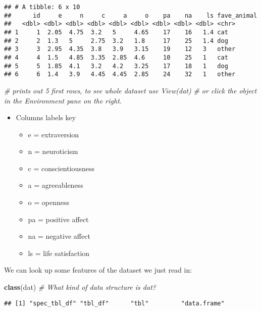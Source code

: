 \documentclass[
]{article}
\newenvironment{Shaded}{\begin{snugshade}}{\end{snugshade}}
\newcommand{\CommentTok}[1]{\textcolor[rgb]{0.56,0.35,0.01}{\textit{#1}}}
\newcommand{\FunctionTok}[1]{\textcolor[rgb]{0.13,0.29,0.53}{\textbf{#1}}}
\newcommand{\NormalTok}[1]{#1}
\providecommand{\tightlist}{%
  \setlength{\itemsep}{0pt}\setlength{\parskip}{0pt}}
\begin{document}
\begin{verbatim}
## # A tibble: 6 x 10
##      id     e     n     c     a     o    pa    na    ls fave_animal
##   <dbl> <dbl> <dbl> <dbl> <dbl> <dbl> <dbl> <dbl> <dbl> <chr>      
## 1     1  2.05  4.75  3.2   5     4.65    17    16   1.4 cat        
## 2     2  1.3   5     2.75  3.2   1.8     17    25   1.4 dog        
## 3     3  2.95  4.35  3.8   3.9   3.15    19    12   3   other      
## 4     4  1.5   4.85  3.35  2.85  4.6     10    25   1   cat        
## 5     5  1.85  4.1   3.2   4.2   3.25    17    18   1   dog        
## 6     6  1.4   3.9   4.45  4.45  2.85    24    32   1   other
\end{verbatim}

\begin{Shaded}
\begin{Highlighting}[]
\CommentTok{\# prints out 5 first rows, to see whole dataset use View(dat) }
\CommentTok{\# or click the object in the Environment pane on the right.}
\end{Highlighting}
\end{Shaded}

\begin{itemize}
\tightlist
\item
  Columns labels key

  \begin{itemize}
  \tightlist
  \item
    e = extraversion
  \item
    n = neuroticism
  \item
    c = conscientiousness
  \item
    a = agreeableness
  \item
    o = openness
  \item
    pa = positive affect
  \item
    na = negative affect
  \item
    ls = life satisfaction
  \end{itemize}
\end{itemize}

We can look up some features of the dataset we just read in:

\begin{Shaded}
\begin{Highlighting}[]
\FunctionTok{class}\NormalTok{(dat) }\CommentTok{\# What kind of data structure is dat? }
\end{Highlighting}
\end{Shaded}

\begin{verbatim}
## [1] "spec_tbl_df" "tbl_df"      "tbl"         "data.frame"
\end{verbatim}
\end{document}
